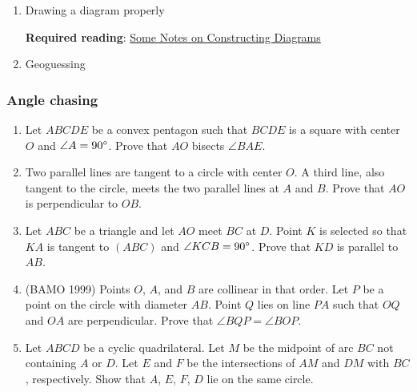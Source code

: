 \documentclass[11pt,paper=letter]{scrartcl}
\begin{document}
\begin{enumerate}
  \item Drawing a diagram properly

  \textbf{Required reading}: \href{http://web.evanchen.cc/handouts/Constructions/Constructions.pdf}{Some Notes on Constructing Diagrams}

  \item Geoguessing



\end{enumerate}

\subsubsection*{Angle chasing}

\begin{enumerate}
  \item Let $ABCDE$ be a convex pentagon such that $BCDE$ is a square with center $O$ and $\angle A = 90^\circ$. Prove that $AO$ bisects $\angle BAE$. %

  \item Two parallel lines are tangent to a circle with center $O$. A third line, also tangent to the circle, meets the two parallel lines at $A$ and $B$. Prove that $AO$ is perpendicular to $OB$.

  \item Let $ABC$ be a triangle and let $AO$ meet $BC$ at $D$. Point $K$ is selected so that $KA$ is tangent to $(ABC)$ and $\angle KCB = 90^\circ$. Prove that $KD$ is parallel to $AB$.
  
  \item (BAMO 1999) Points $O$, $A$, and $B$ are collinear in that order. Let $P$ be a point on the circle with diameter $AB$. Point $Q$ lies on line $PA$ such that $OQ$ and $OA$ are perpendicular. Prove that $\angle BQP = \angle BOP$.

  \item Let $ABCD$ be a cyclic quadrilateral. Let $M$ be the midpoint of arc $BC$ not containing $A$ or $D$. Let $E$ and $F$ be the intersections of $AM$ and $DM$ with $BC$, respectively. Show that $A$, $E$, $F$, $D$ lie on the same circle. 
\end{enumerate}
\end{document}
